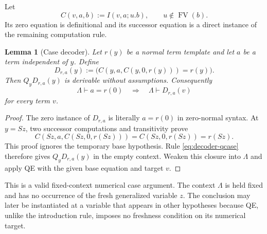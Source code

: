 \documentclass[11pt,a4paper]{article}
\newtheorem{lemma}[theorem]{Lemma}
\theoremstyle{definition}
\begin{document}
Let
\[
 C(v,a,b):=I(v,a;u.b),\qquad u\notin\operatorname{FV}(b).
\]
Its zero equation is definitional and its successor equation is a direct
instance of the remaining computation rule.

\begin{lemma}[Case decoder]
\label{lem:case-decoder}
Let $r(y)$ be a normal term template and let $a$ be a term independent of
$y$.  Define
\[
 D_{r,a}(y):=
 \bigl(C(y,a,C(y,0,r(y)))=r(y)\bigr).
\]
Then $Q_yD_{r,a}(y)$ is derivable without assumptions.  Consequently
\[
 \Lambda\vdash a=r(0)
 \quad\Longrightarrow\quad
 \Lambda\vdash D_{r,a}(v)
\]
for every term $v$.
\end{lemma}
\begin{proof}
The zero instance of $D_{r,a}$ is literally $a=r(0)$ in zero-normal
syntax.  At $y=Sz$, two successor computations and transitivity prove
\[
 C(Sz,a,C(Sz,0,r(Sz)))
   =C(Sz,0,r(Sz))=r(Sz).
\]
This proof ignores the temporary base hypothesis.  Rule
\eqref{eq:decoder-qcase} therefore gives $Q_yD_{r,a}(y)$ in the empty
context.  Weaken this closure into $\Lambda$ and apply QE with the
given base equation and target $v$.
\end{proof}

This is a valid fixed-context numerical case argument.  The context
$\Lambda$ is held fixed and has no occurrence of the fresh generalized
variable $z$.  The conclusion may later be instantiated at a variable
that appears in other hypotheses because QE, unlike the introduction
rule, imposes no freshness condition on its numerical target.
\end{document}
